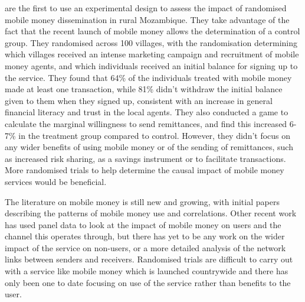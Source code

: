 \cite{Batista2013} are the first to use an experimental design to assess the impact of randomised mobile money dissemination in rural Mozambique. They take advantage of the fact that the recent launch of mobile money allows the determination of a  control group. They randomised across 100 villages, with the randomisation determining which villages received an intense marketing campaign and recruitment of mobile money agents, and which individuals received an initial balance for signing up to the service. They found that 64\% of the individuals treated with mobile money made at least one transaction, while 81\% didn't withdraw the initial balance given to them when they signed up, consistent with an increase in general financial literacy and trust in the local agents. They also conducted a game to calculate the marginal willingness to send remittances, and find this increased 6-7\% in the treatment group compared to control. However, they didn't focus on any wider benefits of using mobile money or of the sending of remittances, such as increased risk sharing, as a savings instrument or to facilitate transactions. More randomised trials to help  determine the causal impact of mobile money services would be beneficial.  

The literature on mobile money is still new and growing, with initial papers describing the patterns of mobile money use and correlations. Other recent work has used panel data to look at the impact of mobile money on users and the channel this operates through, but there has yet to be any work on the wider impact of the service on non-users, or a more detailed analysis of the network links between senders and receivers. Randomised trials are difficult to carry out with a service like mobile money which is launched countrywide and there has only been one to date focusing on use of the service rather than benefits to the user. 

